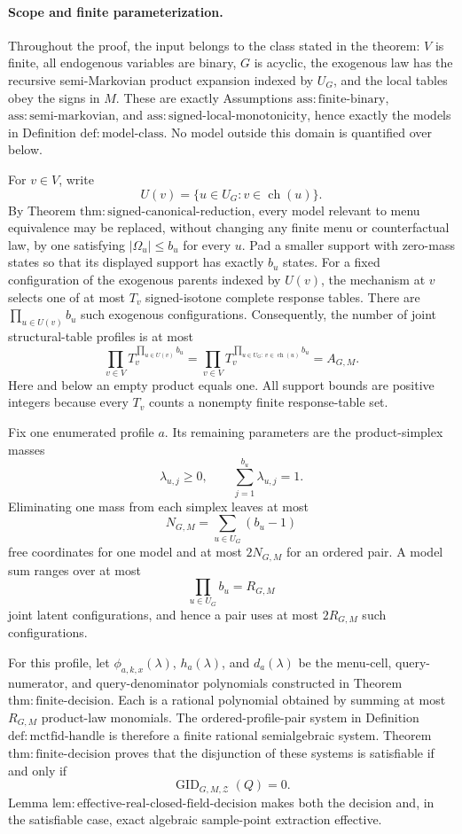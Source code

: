 \paragraph{Scope and finite parameterization.}
Throughout the proof, the input belongs to the class stated in the theorem: \(V\) is finite, all endogenous variables are binary, \(G\) is acyclic, the exogenous law has the recursive semi-Markovian product expansion indexed by \(U_G\), and the local tables obey the signs in \(M\).  These are exactly Assumptions \(\mathrm{ass:finite\text{-}binary}\), \(\mathrm{ass:semi\text{-}markovian}\), and \(\mathrm{ass:signed\text{-}local\text{-}monotonicity}\), hence exactly the models in Definition \(\mathrm{def:model\text{-}class}\).  No model outside this domain is quantified over below.

For \(v\in V\), write
\[
 U(v)=\{u\in U_G:v\in\operatorname{ch}(u)\}.
\]
By Theorem \(\mathrm{thm:signed\text{-}canonical\text{-}reduction}\), every model relevant to menu equivalence may be replaced, without changing any finite menu or counterfactual law, by one satisfying \(|\Omega_u|\le b_u\) for every \(u\).  Pad a smaller support with zero-mass states so that its displayed support has exactly \(b_u\) states.  For a fixed configuration of the exogenous parents indexed by \(U(v)\), the mechanism at \(v\) selects one of at most \(T_v\) signed-isotone complete response tables.  There are \(\prod_{u\in U(v)}b_u\) such exogenous configurations.  Consequently, the number of joint structural-table profiles is at most
\[
 \prod_{v\in V}T_v^{\prod_{u\in U(v)}b_u}
 =\prod_{v\in V}T_v^{\prod_{u\in U_G:\,v\in\operatorname{ch}(u)}b_u}
 =A_{G,M}.
\]
Here and below an empty product equals one.  All support bounds are positive integers because every \(T_v\) counts a nonempty finite response-table set.

Fix one enumerated profile \(a\).  Its remaining parameters are the product-simplex masses
\[
 \lambda_{u,j}\ge 0,
 \qquad
 \sum_{j=1}^{b_u}\lambda_{u,j}=1.
\]
Eliminating one mass from each simplex leaves at most
\[
 N_{G,M}=\sum_{u\in U_G}(b_u-1)
\]
free coordinates for one model and at most \(2N_{G,M}\) for an ordered pair.  A model sum ranges over at most
\[
 \prod_{u\in U_G}b_u=R_{G,M}
\]
joint latent configurations, and hence a pair uses at most \(2R_{G,M}\) such configurations.

For this profile, let \(\phi_{a,k,x}(\lambda)\), \(h_a(\lambda)\), and \(d_a(\lambda)\) be the menu-cell, query-numerator, and query-denominator polynomials constructed in Theorem \(\mathrm{thm:finite\text{-}decision}\).  Each is a rational polynomial obtained by summing at most \(R_{G,M}\) product-law monomials.  The ordered-profile-pair system in Definition \(\mathrm{def:mctfid\text{-}handle}\) is therefore a finite rational semialgebraic system.  Theorem \(\mathrm{thm:finite\text{-}decision}\) proves that the disjunction of these systems is satisfiable if and only if
\[
 \operatorname{GID}_{G,M,\mathcal Z}(Q)=0.
\]
Lemma \(\mathrm{lem:effective\text{-}real\text{-}closed\text{-}field\text{-}decision}\) makes both the decision and, in the satisfiable case, exact algebraic sample-point extraction effective.


